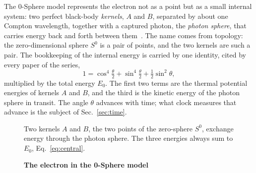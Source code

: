 \documentclass[%
 reprint, amsmath,amssymb, aps, prb, ]{revtex4-2}
\numberwithin{equation}{section}
\begin{document}
The 0-Sphere model represents the electron not as a point but as a small internal system: two perfect black-body \emph{kernels}, $A$ and $B$, separated by about one Compton wavelength, together with a captured photon, the \emph{photon sphere}, that carries energy back and forth between them~\cite{ref:p1}. The name comes from topology: the zero-dimensional sphere $S^0$ is a pair of points, and the two kernels are such a pair. The bookkeeping of the internal energy is carried by one identity, cited by every paper of the series,
\begin{equation}
1 = \cos^4\!\tfrac{\theta}{2} + \sin^4\!\tfrac{\theta}{2} + \tfrac12\sin^2\theta ,
\label{eq:central}
\end{equation}
multiplied by the total energy $E_0$. The first two terms are the thermal potential energies of kernels $A$ and $B$, and the third is the kinetic energy of the photon sphere in transit. The angle $\theta$ advances with time; what clock measures that advance is the subject of Sec.~\ref{sec:time}.

\begin{figure}[t!]
\centering
{}
\caption{\textbf{The electron in the 0-Sphere model}}
\label{fig:model}
\vspace{0.4em}
\begin{minipage}{0.95\columnwidth}
\justifying\small
Two kernels $A$ and $B$, the two points of the zero-sphere $S^0$, exchange energy through the photon sphere. The three energies always sum to $E_0$, Eq.~\eqref{eq:central}.
\end{minipage}
\end{figure}
\end{document}
